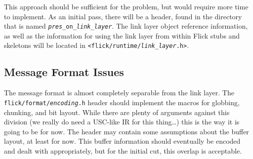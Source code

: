 This approach should be sufficient for the problem, but would require more time
to implement.  As an initial pass, there will be a header, found in the
 directory that is named
\texttt{\emph{pres}\_on\_\emph{link\_layer}}.  The link layer object reference
information, as well as the information for using the link layer from within
Flick stubs and skeletons will be located in
\texttt{<flick/runtime/\emph{link\_layer}.h>}.



\subsection{Message Format Issues}
\label{subsec:Runtime:Message Formal Issues}

The message format is almost completely separable from the link layer.  The
\texttt{flick/format/\emph{encoding}.h} header should implement the macros for
globbing, chunking, and bit layout.  While there are plenty of arguments
against this division (we really do need a USC-like IR for this thing\ldots{})
this is the way it is going to be for now.  The header may contain some
assumptions about the buffer layout, at least for now.  This buffer information
should eventually be encoded and dealt with appropriately, but for the initial
cut, this overlap is acceptable.

\com{

}%



